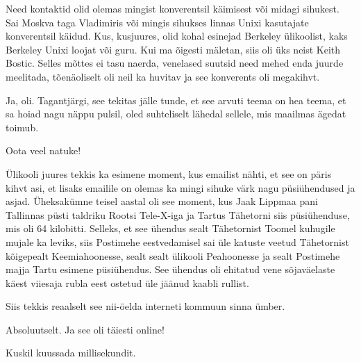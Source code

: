 
Need kontaktid olid olemas  mingist konverentsil käimisest või midagi sihukest. Sai Moskva taga Vladimiris või mingis sihukses linnas Unixi kasutajate konverentsil käidud. Kus, kusjuures,  olid kohal esinejad Berkeley ülikoolist, kaks Berkeley Unixi loojat või guru. Kui ma õigesti mäletan, siis oli üks neist Keith Bostic. Selles mõttes ei tasu naerda, venelased suutsid need mehed enda juurde meelitada, tõenäoliselt oli neil ka huvitav ja see konverents oli megakihvt.


Ja, oli. Tagantjärgi, see tekitas jälle tunde, et see arvuti teema on hea teema, et sa hoiad nagu näppu pulsil, oled suhteliselt lähedal sellele, mis maailmas ägedat toimub.


Oota veel natuke! 

Ülikooli juures tekkis ka esimene moment, kus emailist nähti, et see on päris kihvt asi, et lisaks emailile on olemas ka mingi sihuke värk nagu püsiühendused ja asjad. Üheksakümne teisel aastal oli see moment, kus Jaak Lippmaa pani Tallinnas püsti taldriku Rootsi Tele-X-iga ja Tartus Tähetorni siis püsiühenduse, mis oli 64 kilobitti. Selleks, et see ühendus sealt Tähetornist Toomel kuhugile mujale ka leviks, siis Postimehe eestvedamisel sai üle katuste veetud Tähetornist  kõigepealt Keemiahoonesse, sealt sealt ülikooli Peahoonesse ja sealt Postimehe majja Tartu esimene püsiühendus. See ühendus oli ehitatud vene sõjaväelaste käest viiesaja rubla eest ostetud üle jäänud kaabli rullist.

Siis tekkis reaalselt see nii-öelda interneti kommuun sinna ümber. 


Absoluutselt. Ja see oli täiesti online!


Kuskil kuussada millisekundit.


